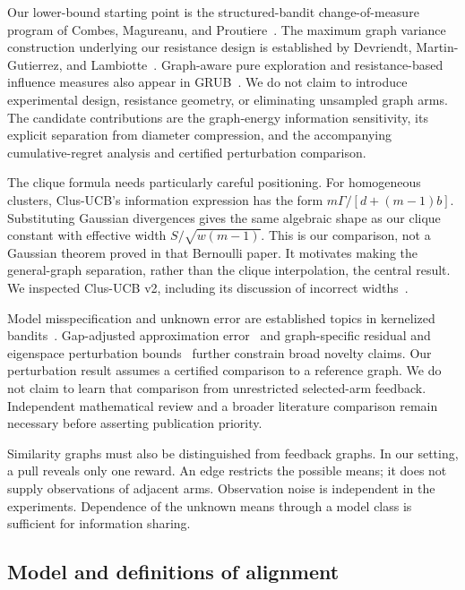Our lower-bound starting point is the structured-bandit change-of-measure program of Combes, Magureanu, and Proutiere~\cite{collected11}. The maximum graph variance construction underlying our resistance design is established by Devriendt, Martin-Gutierrez, and Lambiotte~\cite{collected24}. Graph-aware pure exploration and resistance-based influence measures also appear in GRUB~\cite{collected2}. We do not claim to introduce experimental design, resistance geometry, or eliminating unsampled graph arms. The candidate contributions are the graph-energy information sensitivity, its explicit separation from diameter compression, and the accompanying cumulative-regret analysis and certified perturbation comparison.

The clique formula needs particularly careful positioning. For homogeneous clusters, Clus-UCB's information expression has the form $m\Gamma/[d+(m-1)b]$. Substituting Gaussian divergences gives the same algebraic shape as our clique constant with effective width $S/\sqrt{w(m-1)}$. This is our comparison, not a Gaussian theorem proved in that Bernoulli paper. It motivates making the general-graph separation, rather than the clique interpolation, the central result. We inspected Clus-UCB v2, including its discussion of incorrect widths~\cite{collected19}.

Model misspecification and unknown error are established topics in kernelized bandits~\cite{collected25}. Gap-adjusted approximation error~\cite{collected26} and graph-specific residual and eigenspace perturbation bounds~\cite{collected27} further constrain broad novelty claims. Our perturbation result assumes a certified comparison to a reference graph. We do not claim to learn that comparison from unrestricted selected-arm feedback. Independent mathematical review and a broader literature comparison remain necessary before asserting publication priority.

Similarity graphs must also be distinguished from feedback graphs. In our setting, a pull reveals only one reward. An edge restricts the possible means; it does not supply observations of adjacent arms. Observation noise is independent in the experiments. Dependence of the unknown means through a model class is sufficient for information sharing.

\subsection{Model and definitions of alignment}
